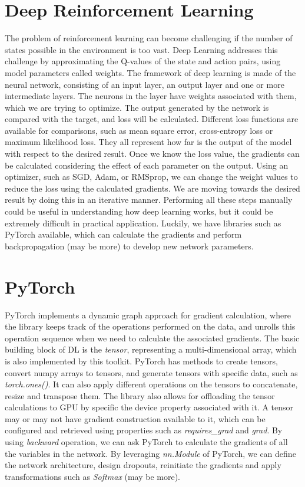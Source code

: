 \documentclass[logo,msc]{infthesis}           %
\begin{document}
\section{Deep Reinforcement Learning}

The problem of reinforcement learning can become challenging if the number of states possible in the environment is too vast. Deep Learning addresses this challenge by approximating the Q-values of the state and action pairs, using model parameters called weights. The framework of deep learning is made of the neural network, consisting of an input layer, an output layer and one or more intermediate layers. The neurons in the layer have weights associated with 
them, which we are trying to optimize. The output generated by the network is compared with the target, and loss will be calculated. Different loss functions are available for comparisons, such as mean square error, cross-entropy loss or maximum likelihood loss. They all represent how far is the output of the model with respect to the desired result. Once we know the loss value, the gradients can be calculated considering the effect of each parameter on the output. Using an optimizer, such as SGD, Adam, or RMSprop, we can change the weight values to reduce the loss using the calculated gradients. We are moving towards the desired result by doing this in an iterative manner. Performing all these steps manually could be useful in understanding how deep learning works, but it could be extremely difficult in practical application. Luckily, we have libraries such as PyTorch available, which can calculate the gradients and perform backpropagation (may be more) to develop new network parameters.

\section{PyTorch}

PyTorch implements a dynamic graph approach for gradient calculation, where the library keeps track of the operations performed on the data, and unrolls this operation sequence when we need to calculate the associated gradients. The basic building block of DL is the \textit{tensor}, representing a multi-dimensional array, which is also implemented by this toolkit. PyTorch has methods to create tensors, convert numpy arrays to tensors, and generate tensors with specific data, such as \textit{torch.ones()}. It can also apply different operations on the tensors to concatenate, resize and transpose them. The library also allows for offloading the tensor calculations to GPU by specific the \textit{}device property associated with it. A tensor may or may not have gradient construction available to it, which can be configured and retrieved using properties such as \textit{requires\_grad} and \textit{grad}. By using \textit{backward} operation, we can ask PyTorch to calculate the gradients of all the variables in the network. By leveraging \textit{nn.Module} of PyTorch, we can define the network architecture, design dropouts, reinitiate the gradients and apply transformations such as \textit{Softmax} (may be more).
\end{document}
